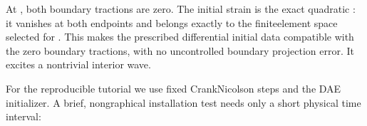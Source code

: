 \documentclass[letterpaper,10pt,english]{sphinxmanual}
\begin{document}
\begin{sphinxVerbatim}[commandchars=\\\{\}]
 
 
 
 
\end{sphinxVerbatim}

\sphinxAtStartPar
At , both boundary tractions are zero. The initial
strain is the exact quadratic : it vanishes at
both endpoints and belongs exactly to the  finite\sphinxhyphen{}element
space selected for . This makes the prescribed differential
initial data compatible with the zero boundary tractions, with no
uncontrolled boundary projection error. It excites a nontrivial
interior wave.

\sphinxAtStartPar
For the reproducible tutorial we use fixed Crank\textendash{}Nicolson steps
and the  DAE initializer. A brief, non\sphinxhyphen{}graphical
installation test needs only a short physical time interval:
\end{document}
